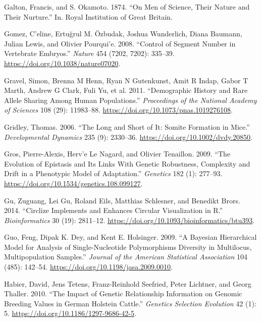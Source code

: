 \documentclass[
]{book}
\newlength{\cslhangindent}
\newlength{\cslentryspacingunit} %
\newenvironment{CSLReferences}[2] %
 {%
  \setlength{\parindent}{0pt}
  \ifodd #1
  \let\oldpar\par
  \def\par{\hangindent=\cslhangindent\oldpar}
  \fi
  \setlength{\parskip}{#2\cslentryspacingunit}
 }%
 {}
\begin{document}
\begin{CSLReferences}{1}{0}
\leavevmode{}%
Galton, Francis, and S. Okamoto. 1874. {``On Men of Science, Their Nature and Their Nurture.''} In. {Royal Institution of Great Britain}.

\leavevmode{}%
Gomez, C'eline, Ertuğrul M. Özbudak, Joshua Wunderlich, Diana Baumann, Julian Lewis, and Olivier Pourqui'e. 2008. {``Control of Segment Number in Vertebrate Embryos.''} \emph{Nature} 454 (7202, 7202): 335--39. \url{https://doi.org/10.1038/nature07020}.

\leavevmode{}%
Gravel, Simon, Brenna M Henn, Ryan N Gutenkunst, Amit R Indap, Gabor T Marth, Andrew G Clark, Fuli Yu, et al. 2011. {``Demographic History and Rare Allele Sharing Among Human Populations.''} \emph{Proceedings of the National Academy of Sciences} 108 (29): 11983--88. \url{https://doi.org/10.1073/pnas.1019276108}.

\leavevmode{}%
Gridley, Thomas. 2006. {``The Long and Short of It: {Somite} Formation in Mice.''} \emph{Developmental Dynamics} 235 (9): 2330--36. \url{https://doi.org/10.1002/dvdy.20850}.

\leavevmode{}%
Gros, Pierre-Alexis, Herv'e Le Nagard, and Olivier Tenaillon. 2009. {``The {Evolution} of {Epistasis} and {Its Links With Genetic Robustness}, {Complexity} and {Drift} in a {Phenotypic Model} of {Adaptation}.''} \emph{Genetics} 182 (1): 277--93. \url{https://doi.org/10.1534/genetics.108.099127}.

\leavevmode{}%
Gu, Zuguang, Lei Gu, Roland Eils, Matthias Schlesner, and Benedikt Brors. 2014. {``Circlize Implements and Enhances Circular Visualization in {R}.''} \emph{Bioinformatics} 30 (19): 2811--12. \url{https://doi.org/10.1093/bioinformatics/btu393}.

\leavevmode{}%
Guo, Feng, Dipak K. Dey, and Kent E. Holsinger. 2009. {``A {Bayesian Hierarchical Model} for {Analysis} of {Single-Nucleotide Polymorphisms Diversity} in {Multilocus}, {Multipopulation Samples}.''} \emph{Journal of the American Statistical Association} 104 (485): 142--54. \url{https://doi.org/10.1198/jasa.2009.0010}.

\leavevmode{}%
Habier, David, Jens Tetens, Franz-Reinhold Seefried, Peter Lichtner, and Georg Thaller. 2010. {``The Impact of Genetic Relationship Information on Genomic Breeding Values in {German Holstein} Cattle.''} \emph{Genetics Selection Evolution} 42 (1): 5. \url{https://doi.org/10.1186/1297-9686-42-5}.


\end{CSLReferences}
\end{document}
